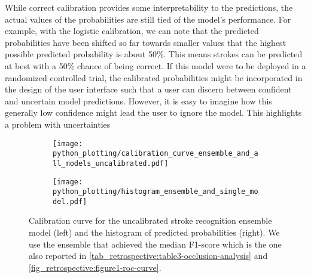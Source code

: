 While correct calibration provides some interpretability to the predictions, the actual values of the probabilities are still tied of the model's performance. For example, with the logistic calibration, we can note that the predicted probabilities have been shifted so far towards smaller values that the highest possible predicted probability is about 50\%. This means strokes can be predicted at best with a 50\% chance of being correct. 
If this model were to be deployed in a randomized controlled trial, the calibrated probabilities might be incorporated in the design of the user interface such that a user can discern between confident and uncertain model predictions. However, it is easy to imagine how this generally low confidence might lead the user to ignore the model. This highlights a problem with uncertainties


\begin{figure}
    \begin{subfigure}[c]{0.48\columnwidth}
        \centering
        \texttt{[image: python\_plotting/calibration\_curve\_ensemble\_and\_all\_models\_uncalibrated.pdf]}
    \end{subfigure}
    \begin{subfigure}[c]{0.48\columnwidth}
        \centering
        \texttt{[image: python\_plotting/histogram\_ensemble\_and\_single\_model.pdf]}
    \end{subfigure}
    \caption[Calibration curve for the uncalibrated stroke recognition model and empirical distribution of predicted probabilities.]{%
        Calibration curve for the uncalibrated stroke recognition ensemble model (left) and the histogram of predicted probabilities (right). 
        We use the ensemble that achieved the median F1-score which is the one also reported in \cref{tab_retrospective:table3-occlusion-analysis} and \cref{fig_retrospective:figure1-roc-curve}.}
    \label{fig_discussion:retrospective-paper-calibration-curve-of-uncalibrated-model}
\end{figure}

